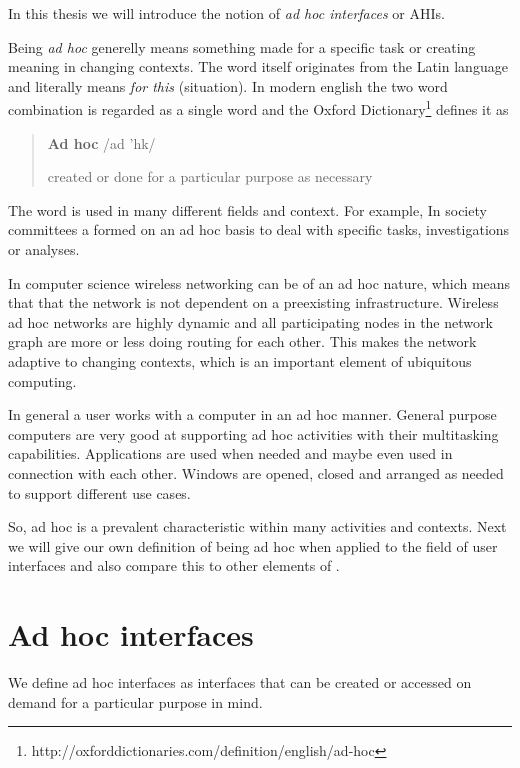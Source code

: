 
In this thesis we will introduce the notion of \emph{ad hoc interfaces} or AHIs.

Being \emph{ad hoc} generelly means something made for a specific task or creating meaning in changing contexts.
The word itself originates from the Latin language and literally means \emph{for this} (situation). 
In modern english the two word combination is regarded as a single word and the Oxford Dictionary\footnote{http://oxforddictionaries.com/definition/english/ad-hoc} defines it as

\begin{quotation}
\textbf{Ad hoc}  /ad 'h\textturnscripta k/

created or done for a particular purpose as necessary
\end{quotation}

The word is used in many different fields and context.
For example, In society committees a formed on an ad hoc basis to deal with specific tasks, investigations or analyses.

In computer science wireless networking can be of an ad hoc nature, which means that that the network is not dependent on a preexisting infrastructure.
Wireless ad hoc networks are highly dynamic and all participating nodes in the network graph are more or less doing routing for each other.
This makes the network adaptive to changing contexts, which is an important element of ubiquitous computing.

In general a user works with a computer in an ad hoc manner.
General purpose computers are very good at supporting ad hoc activities with their multitasking capabilities.
Applications are used when needed and maybe even used in connection with each other.
Windows are opened, closed and arranged as needed to support different use cases.

So, ad hoc is a prevalent characteristic within many activities and contexts.
Next we will give our own definition of being ad hoc when applied to the field of user interfaces and also compare this to other elements of .

\section{Ad hoc interfaces} 
We define ad hoc interfaces as  interfaces that can be created or accessed on demand for a particular purpose in mind. 

